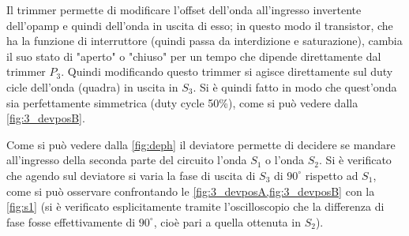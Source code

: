 \documentclass[a4paper,10pt]{article}
\begin{document}
Il trimmer permette di modificare l'offset dell'onda all'ingresso invertente dell'opamp e quindi dell'onda in uscita di esso; in questo modo il transistor, che ha la funzione di interruttore (quindi passa da interdizione e saturazione), cambia il suo stato di "aperto" o "chiuso" per un tempo che dipende direttamente dal trimmer $P_3$. Quindi modificando questo trimmer si agisce direttamente sul duty cicle dell'onda (quadra) in uscita in $S_3$. Si è quindi fatto in modo che quest'onda sia perfettamente simmetrica (duty cycle 50\%), come si può vedere dalla
\cref{fig:3_devposB}.

Come si può vedere dalla \cref{fig:deph} il deviatore permette di decidere se mandare
all'ingresso della seconda parte del circuito l'onda $S_1$ o l'onda $S_2$. 
Si è verificato che agendo sul deviatore si varia la fase di uscita di $S_3$ di
$90^\circ$ rispetto ad $S_1$, come si può osservare confrontando le \cref{fig:3_devposA,fig:3_devposB} con la \cref{fig:s1} (si è verificato esplicitamente tramite l'oscilloscopio che la differenza di fase fosse effettivamente di $90^\circ$, cioè pari a quella ottenuta in $S_2$).
\end{document}

